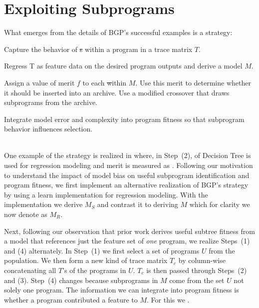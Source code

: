 \section{Exploiting Subprograms}\label{sect:foreground}
What emerges from the details of BGP's successful examples is a strategy:  
\begin{inparaenum}

\item Capture the behavior of \st{s} within a program in a trace matrix $T$.

\item  Regress T as feature data on the desired program outputs and derive a model $M$. 

\item Assign a value of merit $f$ to each \st within $M$. Use this merit to determine whether it should be inserted into an archive. Use a modified crossover that draws subprograms from the archive. 

\item Integrate model error and complexity into program fitness so that subprogram behavior influences selection.
\end{inparaenum} \\

One example of the strategy is realized in \cite{KrawiecGECCO2014} where, in Step~(2),  of Decision Tree is used for regression modeling and merit is measured as .  Following our motivation to understand the impact of model bias on useful subprogram identification and program fitness, we first implement an alternative realization of BGP's strategy by using a \SCIKIT learn implementation for regression modeling.  With the \SCIKIT implementation we derive $M_S$ and contrast it to deriving $M$ which for clarity we now denote as $M_R$. 

Next, following our observation that prior work derives useful subtree fitness from a model that references just the feature set of \textit{one} program, we realize Steps~(1) and (4) alternately.  In Step~(1) we first select a set of programs  $U$ from the population. We then form a new kind of trace matrix $T_c$ by column-wise concatenating all $T${'s} of the programs in $U$.  $T_c$ is then passed through Steps~(2) and (3). Step~(4) changes because subprograms in $M$ come from the set $U$ not solely one program. The information we can integrate into program fitness is whether a program contributed a feature to $M$. For this we .

